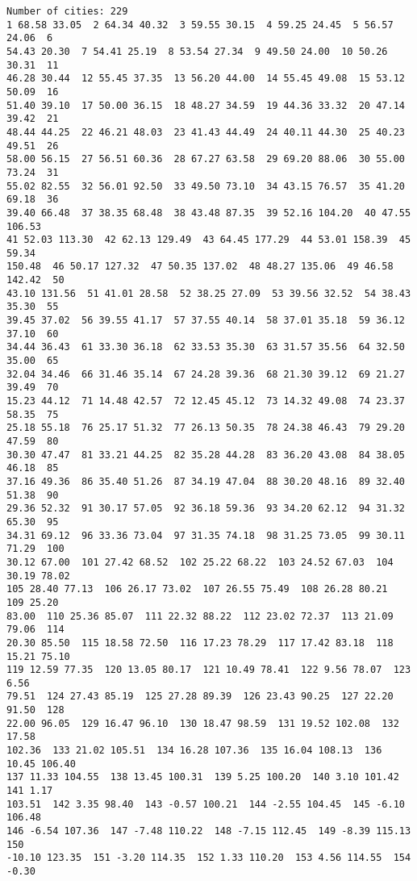 \documentclass[11pt]{article}
\begin{document}
    \begin{Verbatim}[commandchars=\\\{\}]
Number of cities: 229
1 68.58 33.05  2 64.34 40.32  3 59.55 30.15  4 59.25 24.45  5 56.57 24.06  6
54.43 20.30  7 54.41 25.19  8 53.54 27.34  9 49.50 24.00  10 50.26 30.31  11
46.28 30.44  12 55.45 37.35  13 56.20 44.00  14 55.45 49.08  15 53.12 50.09  16
51.40 39.10  17 50.00 36.15  18 48.27 34.59  19 44.36 33.32  20 47.14 39.42  21
48.44 44.25  22 46.21 48.03  23 41.43 44.49  24 40.11 44.30  25 40.23 49.51  26
58.00 56.15  27 56.51 60.36  28 67.27 63.58  29 69.20 88.06  30 55.00 73.24  31
55.02 82.55  32 56.01 92.50  33 49.50 73.10  34 43.15 76.57  35 41.20 69.18  36
39.40 66.48  37 38.35 68.48  38 43.48 87.35  39 52.16 104.20  40 47.55 106.53
41 52.03 113.30  42 62.13 129.49  43 64.45 177.29  44 53.01 158.39  45 59.34
150.48  46 50.17 127.32  47 50.35 137.02  48 48.27 135.06  49 46.58 142.42  50
43.10 131.56  51 41.01 28.58  52 38.25 27.09  53 39.56 32.52  54 38.43 35.30  55
39.45 37.02  56 39.55 41.17  57 37.55 40.14  58 37.01 35.18  59 36.12 37.10  60
34.44 36.43  61 33.30 36.18  62 33.53 35.30  63 31.57 35.56  64 32.50 35.00  65
32.04 34.46  66 31.46 35.14  67 24.28 39.36  68 21.30 39.12  69 21.27 39.49  70
15.23 44.12  71 14.48 42.57  72 12.45 45.12  73 14.32 49.08  74 23.37 58.35  75
25.18 55.18  76 25.17 51.32  77 26.13 50.35  78 24.38 46.43  79 29.20 47.59  80
30.30 47.47  81 33.21 44.25  82 35.28 44.28  83 36.20 43.08  84 38.05 46.18  85
37.16 49.36  86 35.40 51.26  87 34.19 47.04  88 30.20 48.16  89 32.40 51.38  90
29.36 52.32  91 30.17 57.05  92 36.18 59.36  93 34.20 62.12  94 31.32 65.30  95
34.31 69.12  96 33.36 73.04  97 31.35 74.18  98 31.25 73.05  99 30.11 71.29  100
30.12 67.00  101 27.42 68.52  102 25.22 68.22  103 24.52 67.03  104 30.19 78.02
105 28.40 77.13  106 26.17 73.02  107 26.55 75.49  108 26.28 80.21  109 25.20
83.00  110 25.36 85.07  111 22.32 88.22  112 23.02 72.37  113 21.09 79.06  114
20.30 85.50  115 18.58 72.50  116 17.23 78.29  117 17.42 83.18  118 15.21 75.10
119 12.59 77.35  120 13.05 80.17  121 10.49 78.41  122 9.56 78.07  123 6.56
79.51  124 27.43 85.19  125 27.28 89.39  126 23.43 90.25  127 22.20 91.50  128
22.00 96.05  129 16.47 96.10  130 18.47 98.59  131 19.52 102.08  132 17.58
102.36  133 21.02 105.51  134 16.28 107.36  135 16.04 108.13  136 10.45 106.40
137 11.33 104.55  138 13.45 100.31  139 5.25 100.20  140 3.10 101.42  141 1.17
103.51  142 3.35 98.40  143 -0.57 100.21  144 -2.55 104.45  145 -6.10 106.48
146 -6.54 107.36  147 -7.48 110.22  148 -7.15 112.45  149 -8.39 115.13  150
-10.10 123.35  151 -3.20 114.35  152 1.33 110.20  153 4.56 114.55  154 -0.30

\end{Verbatim}
\end{document}
